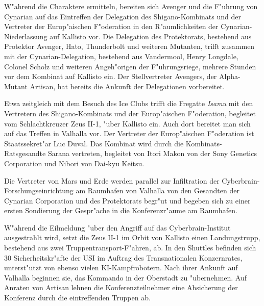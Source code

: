 
W"ahrend die Charaktere ermitteln, bereiten sich Avenger und die F"uhrung von Cynarian auf das Eintreffen der Delegation des Shigano-Kombinats und der Vertreter der Europ"aischen F"oderation in den R"aumlichkeiten der Cynarian-Niederlassung auf Kallisto vor. Die Delegation des Protektorats, bestehend aus Protektor Avenger, Hato, Thunderbolt und weiteren Mutanten, trifft zusammen mit der Cynarian-Delegation, bestehend aus Vandermool, Henry Longdale, Colonel Scholz und weiteren Angeh"origen der F"uhrungsriege, mehrere Stunden vor dem Kombinat auf Kallisto ein. Der Stellvertreter Avengers, der Alpha-Mutant Artisan, hat bereits die Ankunft der Delegationen vorbereitet.

Etwa zeitgleich mit dem Besuch des Ice Clubs trifft die Fregatte \emph{Isamu} mit den Vertretern des Shigano-Kombinats und der Europ"aischen F"oderation, begleitet vom Schlachtkreuzer Zeus II-1, "uber Kallisto ein. Auch dort bereitet man sich auf das Treffen in Valhalla vor. Der Vertreter der Europ"aischen F"oderation ist Staatssekret"ar Luc Duval. Das Kombinat wird durch die Kombinats-Ratsgesandte Sarana vertreten, begleitet von Itori Makon von der Sony Genetics Corporation und Nibori von Dai-kyu Keitsu.

Die Vertreter von Mars und Erde werden parallel zur Infiltration der Cyberbrain-Forschungseinrichtung am Raumhafen von Valhalla von den Gesandten der Cynarian Corporation und des Protektorats begr"u\3t und begeben sich zu einer ersten Sondierung der Gespr"ache in die Konferenzr"aume am Raumhafen.



W"ahrend die Eilmeldung "uber den Angriff auf das Cyberbrain-Institut ausgestrahlt wird, setzt die Zeus II-1 im Orbit von Kallisto einen Landungstrupp, bestehend aus zwei Truppentransport-F"ahren, ab. In den Shuttles befinden sich 30 Sicherheitskr"afte der USI im Auftrag des Transnationalen Konzernrates, unterst"utzt von ebenso vielen KI-Kampfrobotern. Nach ihrer Ankunft auf Valhalla beginnen sie, das Kommando in der Oberstadt zu "ubernehmen. Auf Anraten von Artisan lehnen die Konferenzteilnehmer eine Absicherung der Konferenz durch die eintreffenden Truppen ab.

